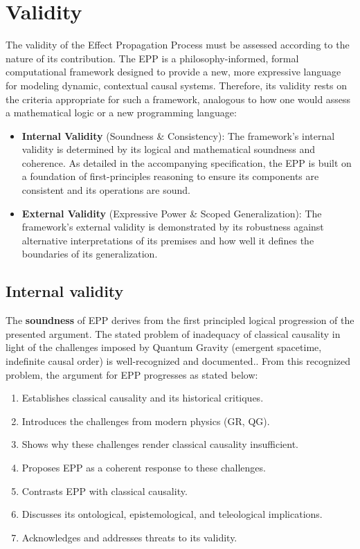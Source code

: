 \section{Validity}
\label{sec:validity}

The validity of the Effect Propagation Process must be assessed according to the nature of its contribution. The EPP is
a philosophy-informed, formal computational framework designed to provide a new, more expressive language for modeling
dynamic, contextual causal systems. Therefore, its validity rests on the criteria appropriate for such a framework,
analogous to how one would assess a mathematical logic or a new programming language:

\begin{itemize}
    \item \textbf{Internal Validity} (Soundness \& Consistency): The framework's internal validity is determined by its logical and
  mathematical soundness and coherence. As detailed in the accompanying specification, the EPP is built on a foundation
  of first-principles reasoning to ensure its components are consistent and its operations are sound.
  \item \textbf{External Validity} (Expressive Power \& Scoped Generalization): The framework's external validity is demonstrated by its
  robustness against alternative interpretations of its premises and how well it defines the boundaries of its
  generalization.
\end{itemize}



\subsection{Internal validity}
\label{sec:validity_internal}

The \textbf{soundness} of EPP derives from the first principled logical progression of the presented argument. The stated problem of inadequacy of classical causality in light of the challenges imposed by Quantum Gravity (emergent spacetime, indefinite causal order) is well-recognized and documented\cite{MriniHardyIndefinite}.. From this recognized problem, the argument for EPP progresses as stated below:

\begin{enumerate}
    \item Establishes classical causality and its historical critiques.
    \item Introduces the challenges from modern physics (GR, QG).
    \item Shows why these challenges render classical causality insufficient.
    \item Proposes EPP as a coherent response to these challenges.
    \item Contrasts EPP with classical causality.
    \item Discusses its ontological, epistemological, and teleological implications.
    \item Acknowledges and addresses threats to its validity.
\end{enumerate}

